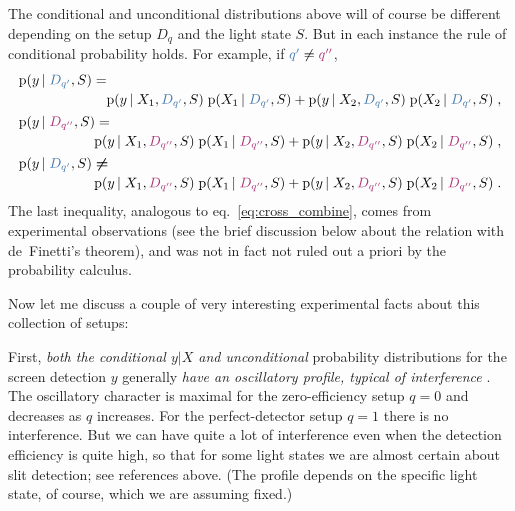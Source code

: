 \documentclass[\ifafour a4paper,12pt,\else a5paper,10pt,\fi%
onecolumn,oneside,article,%
british%
]{memoir}
\theoremstyle{remark}
\theoremstyle{innote}
\newcommand*{\citep}{\parencites}%
\newcommand*{\pf}{\mathrm{p}}%
\renewcommand*{\|}[1][]{\nonscript\,#1\vert\nonscript\;\mathopen{}}
\newcommand*{\eqn}{eq.}%
\newcommand*{\yxa}{X_{1}}
\newcommand*{\yxb}{X_{2}}
\newcommand*{\yDq}{D_{q}}
\newcommand*{\yDqa}{\textcolor{mypurpleblue}{D_{q'}}}
\newcommand*{\yDqb}{\textcolor{myredpurple}{D_{q''}}}
\newcommand*{\yqa}{\textcolor{mypurpleblue}{q'}}
\newcommand*{\yqb}{\textcolor{myredpurple}{q''}}
\begin{document}
The conditional and unconditional distributions above will of course be
different depending on the setup $\yDq$ and the light state $S$. But in
each instance the rule of conditional probability holds. For example, if
$\yqa \ne \yqb$,
\begin{gather}
  \begin{multlined}[][\linewidth]
    \pf(y \| \yDqa, S) ={}\\
  \pf(y \| \yxa, \yDqa, S) \;\pf( \yxa \| \yDqa, S) +
  \pf(y \| \yxb, \yDqa, S) \;\pf( \yxb \| \yDqa, S) \;,
\end{multlined}
\\
  \begin{multlined}[][\linewidth]
    \pf(y \| \yDqb, S) ={}\\
  \pf(y \| \yxa, \yDqb, S) \;\pf( \yxa \| \yDqb, S) +
  \pf(y \| \yxb, \yDqb, S) \;\pf( \yxb \| \yDqb, S) \;,
\end{multlined}
\\
  \begin{multlined}[][\linewidth]
    \pf(y \| \yDqa, S) \mathrel{\bm{\ne}} {}\\
  \pf(y \| \yxa, \yDqb, S) \;\pf( \yxa \| \yDqb, S) +
  \pf(y \| \yxb, \yDqb, S) \;\pf( \yxb \| \yDqb, S) \;.
\end{multlined}
\end{gather}
The last inequality, analogous to \eqn~\eqref{eq:cross_combine}, comes from
experimental observations (see the brief discussion below about the
relation with de~Finetti's theorem), and was not in fact not ruled out a
priori by the probability calculus.




\medskip

Now let me discuss a couple of very interesting experimental facts about
this collection of setups:

First, \emph{both the conditional $y\vert X$ and unconditional} probability
distributions for the screen detection $y$ generally \emph{have an
  oscillatory profile, typical of interference}
\citep{woottersetal1979,banaszeketal2013}[see also][for other experimental
variations]{chiaoetal1995}. The oscillatory character is maximal for the
zero-efficiency setup $q=0$ and decreases as $q$ increases. For the
perfect-detector setup $q=1$ there is no interference. But we can have
quite a lot of interference even when the detection efficiency is quite
high, so that for some light states we are almost certain about slit
detection; see references above. (The profile depends on the specific light
state, of course, which we are assuming fixed.)
  
\end{document}
